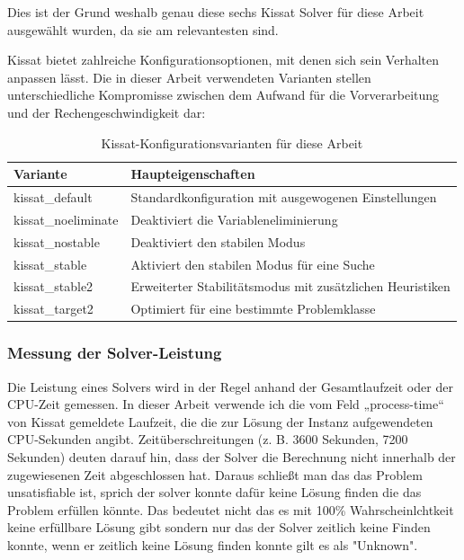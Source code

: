 Dies ist der Grund weshalb genau diese sechs Kissat Solver für diese Arbeit ausgewählt wurden, da sie am 
relevantesten sind.

Kissat bietet zahlreiche Konfigurationsoptionen, mit denen sich sein Verhalten anpassen lässt. Die in 
dieser Arbeit verwendeten Varianten stellen unterschiedliche Kompromisse zwischen dem Aufwand für die 
Vorverarbeitung und der Rechengeschwindigkeit dar:

\begin{table}[htbp]
    \centering
    \begin{tabular}{lp{}}
        \textbf{Variante} & \textbf{Haupteigenschaften} \\
        \toprule
        kissat\_default & Standardkonfiguration mit ausgewogenen Einstellungen \\
        \midrule
        kissat\_noeliminate & Deaktiviert die Variableneliminierung \\
        \midrule
        kissat\_nostable & Deaktiviert den stabilen Modus \\
        \midrule
        kissat\_stable & Aktiviert den stabilen Modus für eine Suche \\
        \midrule
        kissat\_stable2 & Erweiterter Stabilitätsmodus mit zusätzlichen Heuristiken \\
        \midrule
        kissat\_target2 & Optimiert für eine bestimmte Problemklasse \\
        \bottomrule
    \end{tabular}
    \caption{Kissat-Konfigurationsvarianten für diese Arbeit}\label{tab:kissat_variants}
\end{table}

\subsubsection{Messung der Solver-Leistung}

Die Leistung eines Solvers wird in der Regel anhand der Gesamtlaufzeit oder der CPU-Zeit gemessen. In 
dieser Arbeit verwende ich die vom Feld „process-time“ von Kissat gemeldete Laufzeit, die die zur Lösung 
der Instanz aufgewendeten CPU-Sekunden angibt. Zeitüberschreitungen (z. B. 3600 Sekunden, 7200 Sekunden) 
deuten darauf hin, dass der Solver die Berechnung nicht innerhalb der zugewiesenen Zeit abgeschlossen hat.\cite{biere2020kissat}
Daraus schließt man das das Problem unsatisfiable ist, sprich der solver konnte dafür keine Lösung finden 
die das Problem erfüllen könnte. Das bedeutet nicht das es mit 100\% Wahrscheinlchtkeit keine erfüllbare 
Lösung gibt sondern nur das der Solver zeitlich keine Finden konnte, wenn er zeitlich keine Lösung finden konnte 
gilt es als "Unknown".

